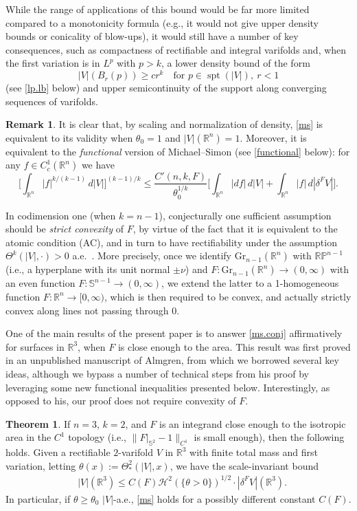\documentclass[11pt,a4paper]{amsart}
\newcommand{\R}{\mathbb{R}}
\theoremstyle{definition}
\newtheorem{rmk}[definition]{Remark}
\newtheorem{thm}[definition]{Theorem}
\begin{document}
While the range of applications of this bound would be far more limited compared to a monotonicity formula (e.g., it would not give upper density bounds or conicality of blow-ups),
it would still have a number of key consequences, such as compactness of rectifiable and integral varifolds and, when the first variation is in $L^p$ with $p>k$, a lower density bound of the form
$$|V|(B_r(p))\ge cr^k\quad\text{for }p\in\operatorname{spt}(|V|),\ r<1$$
(see \cref{lp.lb} below) and upper semicontinuity of the support along converging sequences of varifolds.

\begin{rmk}
It is clear that, by scaling and normalization of density, \cref{ms} is equivalent to its validity
when $\theta_0=1$ and $|V|(\R^n)=1$. Moreover, it is equivalent to the \emph{functional} version of Michael--Simon (see \cref{functional} below):
for any $f\in C^1_c(\R^n)$ we have
\begin{equation}\label{ms.f}
    \Big[\int_{\R^n}|f|^{k/(k-1)}\,d|V|\Big]^{(k-1)/k}\le \frac{C'(n,k,F)}{\theta_0^{1/k}}
\Big[\int_{\R^n}|df|\,d|V|+\int_{\R^n}|f|\,d|\delta^FV|\Big].
\end{equation}
\end{rmk}

In codimension one (when $k=n-1$), conjecturally one sufficient assumption should be \emph{strict convexity} of $F$, by virtue of the fact that it is equivalent to the atomic condition (AC), and in turn to have rectifiability under the assumption $\Theta^k(|V|,\cdot)>0$ a.e.\ \cite{DDG}.
More precisely,
once we identify $\text{Gr}_{n-1}(\R^n)$ with $\mathbb{RP}^{n-1}$ (i.e., a hyperplane with its
unit normal $\pm\nu$) and $F:\text{Gr}_{n-1}(\R^n)\to(0,\infty)$ with an even function
$F:\mathbb{S}^{n-1}\to(0,\infty)$, we extend the latter to a 1-homogeneous function $F:\R^n\to[0,\infty)$,
which is then required to be convex, and actually strictly convex along lines not passing through $0$.

One of the main results of the present paper is to answer \cref{ms.conj} affirmatively
for surfaces in $\R^3$, when $F$ is close enough to the area. This result was first
proved in an unpublished manuscript of Almgren, from which we borrowed several key ideas,
although we bypass a number of technical steps from his proof by leveraging some new functional inequalities presented below. Interestingly, as opposed to his, our proof does not require convexity of $F$.

\begin{thm}\label{main}
    If $n=3$, $k=2$, and $F$ is an integrand close enough to the isotropic area in the $C^1$ topology (i.e., $\|F|_{\mathbb{S}^{2}}-1\|_{C^1}$ is small enough), then the following holds.
    Given a rectifiable $2$-varifold $V$ in $\R^3$ with finite total mass and first variation,
    letting $\theta(x):=\Theta_*^2(|V|,x)$, we have the scale-invariant bound
	\begin{align}\label{ms.stronger}
		&|V|(\R^3)\le C(F)\mathcal{H}^2(\{\theta>0\})^{1/2}\cdot|\delta^F V|(\R^3).
	\end{align}
	In particular, if $\theta\ge\theta_0$ $|V|$-a.e., \cref{ms} holds for a possibly different constant $C(F)$.
\end{thm}
\end{document}
